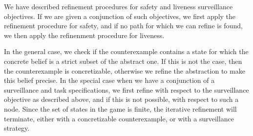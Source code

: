 We have described refinement procedures for safety and liveness surveillance objectives. If we are given a conjunction of such objectives, we first apply the refinement procedure for safety, and if no path for which we can refine is found, we then apply the refinenment procedure for liveness. 

In the general case, we check if the counterexample contains a state for which the concrete belief is a strict subset of the abstract one. If this is not the case, then the counterexample is concretizable, otherwise we refine the abstraction to make this belief precise. In the special case when we have a conjunction of a surveillance and task specifications, we first refine with respect to the surveillance objective as described above, and if this is not possible, with respect to such a node. Since the set of states in the game is finite, the iterative refinement will terminate, either with a concretizable counterexample, or with a surveillance strategy.  



